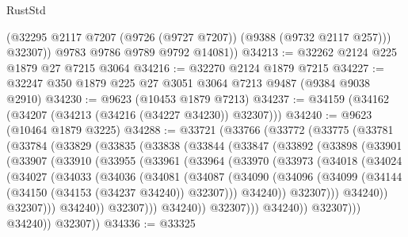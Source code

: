 \begin{lexlean}{RustStd}
\begin{coremodule}
            (@32295 @2117 @7207 (@9726 (@9727 @7207)) (@9388 (@9732 @2117 @257)))
            @32307))
        @9783
        @9786
        @9789
        @9792
        @14081))
@34213 := @32262 @2124 @225 @1879 @27 @7215 @3064
@34216 := @32270 @2124 @1879 @7215
@34227 := @32247 @350 @1879 @225 @27 @3051 @3064 @7213 @9487 (@9384 @9038 @2910)
@34230 := @9623 (@10453 @1879 @7213)
@34237 := @34159 (@34162 (@34207 (@34213 (@34216 (@34227 @34230)) @32307)))
@34240 := @9623 (@10464 @1879 @3225)
@34288 := @33721
    (@33766
      (@33772
        (@33775
          (@33781
            (@33784
              (@33829
                (@33835
                  (@33838
                    (@33844
                      (@33847
                        (@33892
                          (@33898
                            (@33901
                              (@33907
                                (@33910
                                  (@33955
                                    (@33961
                                      (@33964
                                        (@33970
                                          (@33973
                                            (@34018
                                              (@34024
                                                (@34027
                                                  (@34033
                                                    (@34036
                                                      (@34081
                                                        (@34087
                                                          (@34090
                                                            (@34096
                                                              (@34099
                                                                (@34144
                                                                  (@34150
                                                                    (@34153 (@34237 @34240))
                                                                    @32307)))
                                                              @34240))
                                                          @32307)))
                                                    @34240))
                                                @32307)))
                                          @34240))
                                      @32307)))
                                @34240))
                            @32307)))
                      @34240))
                  @32307)))
            @34240))
        @32307))
@34336 := @33325

\end{coremodule}
\end{lexlean}
